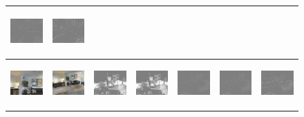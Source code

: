 \documentclass[letterpaper, 10 pt, conference]{ieeeconf}  %
\begin{document}
\begin{figure}[h!]
\begin{center}
\begin{tabular}{|c| c |c | c | c | c | c|}
  \includegraphics[width=18mm, height=17mm]{DepthNetwork/QUANTICO/ferror.png} &
    \includegraphics[width=18mm, height=17mm]{FlowDepth/QUANTICO/ferror.png}

 \\ \hline
\includegraphics[width=18mm, height=17mm]{TrueDepth/HILLSDALE/init.png} &   
            \includegraphics[width=18mm, height=17mm]{TrueDepth/HILLSDALE/des.png} & 
           \includegraphics[width=18mm, height=17mm]{PhotoVS/HILLSDALE/ferror.png} & 
           \includegraphics[width=18mm, height=17mm]{ICRA17/HILLSDALE/ferror.png} & 
 \includegraphics[width=18mm, height=17mm]{TrueDepth/HILLSDALE/ferror.png} & 
  \includegraphics[width=18mm, height=17mm]{DepthNetwork/HILLSDALE/ferror.png} &
    \includegraphics[width=18mm, height=17mm]{FlowDepth/HILLSDALE/ferror.png} 


\end{tabular}
\end{center}
\end{figure}
\end{document}
